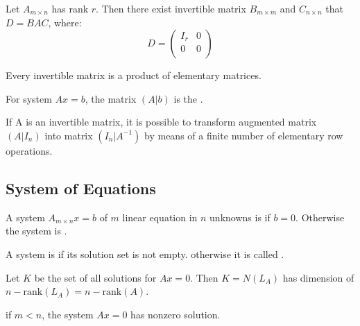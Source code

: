 \begin{theorem}
    Let $A_{m \times n}$ has rank $r$. Then there exist invertible matrix $B_{m \times m}$ and $C_{n \times n}$ that $D=BAC$, where:
    \begin{equation*}
        D = \begin{pmatrix}
			I_r & 0 \\
			0 & 0 \\
		\end{pmatrix}
    \end{equation*}
\end{theorem}


\begin{theorem}
    Every invertible matrix is a product of elementary matrices.
\end{theorem}

\begin{definition}
	For system $Ax=b$, the matrix $(A|b)$ is the .
\end{definition}


\begin{theorem}
    If A is an invertible matrix, it is possible to transform augmented matrix $(A|I_n)$ into matrix $(I_n|A^{-1})$ by means of a finite number of elementary row operations.
\end{theorem}

\subsection{System of Equations}

\begin{definition}
	A system $A_{m \times n} x=b$ of $m$ linear equation in $n$ unknowns is  if $b=0$. Otherwise the system is .
\end{definition}

\begin{definition}
	A system is  if its solution set is not empty. otherwise it is called .
\end{definition}

\begin{theorem}
	Let $K$ be the set of all solutions for $Ax=0$. Then $K=N(L_A)$ has dimension of $n-\text{rank}(L_A)=n-\text{rank}(A)$.
\end{theorem}

\begin{theorem}
	if $m < n$, the system $Ax=0$ has nonzero solution.
\end{theorem}

